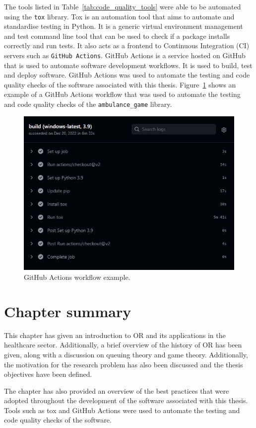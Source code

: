 The tools listed in Table~\ref{tab:code_quality_tools} were able to be
automated using the \texttt{tox} library.
Tox is an automation tool that aims to automate and standardise testing in
Python.
It is a generic virtual environment management and test command line tool that
can be used to check if a package installs correctly and run tests.
It also acts as a frontend to Continuous Integration (CI) servers such as
\texttt{GitHub Actions}.
GitHub Actions is a service hosted on GitHub that is used to automate software
development workflows.
It is used to build, test and deploy software.
GitHub Actions was used to automate the testing and code quality checks of the
software associated with this thesis.
Figure~\ref{fig:github_actions} shows an example of a GitHub Actions workflow
that was used to automate the testing and code quality checks of the
\texttt{ambulance\_game} library.

\begin{figure}[H]
    \includegraphics[width=\linewidth]{chapters/01_introduction/Bin/github_actions.JPG}
    \caption{GitHub Actions workflow example.}
    \label{fig:github_actions}
\end{figure}


\section{Chapter summary}

This chapter has given an introduction to OR and its applications in the
healthcare sector.
Additionally, a brief overview of the history of OR has been given, along with
a discussion on queuing theory and game theory.
Additionally, the motivation for the research problem has also been discussed
and the thesis objectives have been defined.

The chapter has also provided an overview of the best practices that were
adopted throughout the development of the software associated with this thesis.
Tools such as tox and GitHub Actions were used to automate the testing
and code quality checks of the software.


